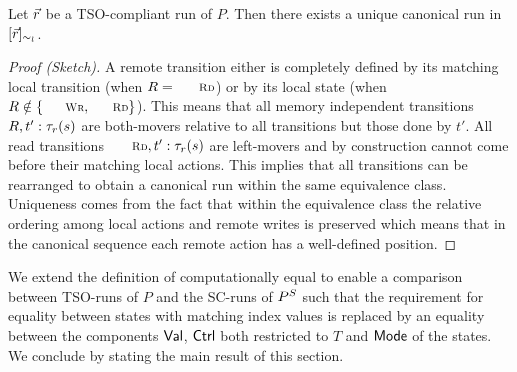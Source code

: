 \begin{lemma}\label{lem:canonical}
Let $\vec{r}$ be a TSO-compliant run of $P$.
Then there exists a unique canonical run in $[\vec{r}]_{\sim_l}$.
\end{lemma}
\begin{proof}[Proof (Sketch)]
A remote transition either is completely defined by its matching local transition (when $R=\textnormal{\sc\small Rd}$) or by its local state (when $R\notin\{\textnormal{\sc\small Wr},\textnormal{\sc\small Rd}\}$).
This means that all memory independent transitions $R,t':\tau_{r}(s)$ are both-movers relative to all transitions but those done by $t'$.
All read transitions $\textnormal{\sc\small Rd},t':\aliremtransx s$ are left-movers and by construction cannot come before their matching local actions.
This implies that all transitions can be rearranged to obtain a canonical run within the same equivalence class.
Uniqueness comes from the fact that within the equivalence class the relative ordering among local actions and remote writes is preserved which means that in the canonical sequence each remote action has a well-defined position.
\end{proof}


We extend the definition of computationally equal to enable a comparison between TSO-runs of $P$ and the SC-runs of $P^S$ such that the requirement for equality between states with matching index values is replaced by an equality between the components $\mathsf{Val}$, $\mathsf{Ctrl}$ both restricted to $T$ and $\mathsf{Mode}$ of the states.
We conclude by stating the main result of this section.


